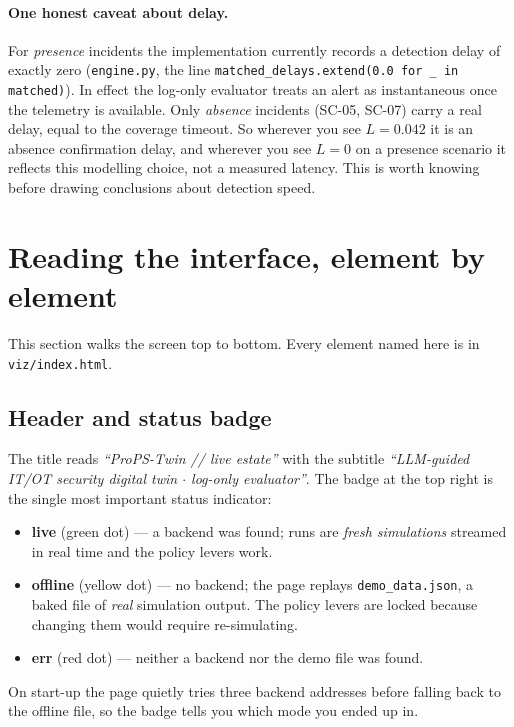 \documentclass[11pt]{article}
\newcommand{\code}[1]{\texttt{\small #1}}
\newcommand{\file}[1]{\textcolor{mfpurple}{\texttt{\small #1}}}
\begin{document}
\paragraph{One honest caveat about delay.} For \emph{presence} incidents the
implementation currently records a detection delay of exactly zero
(\file{engine.py}, the line
\code{matched\_delays.extend(0.0 for \_ in matched)}). In effect the log-only
evaluator treats an alert as instantaneous once the telemetry is available.
Only \emph{absence} incidents (SC-05, SC-07) carry a real delay, equal to the
coverage timeout. So wherever you see $L=0.042$ it is an absence confirmation
delay, and wherever you see $L=0$ on a presence scenario it reflects this
modelling choice, not a measured latency. This is worth knowing before drawing
conclusions about detection speed.

\section{Reading the interface, element by element}
\label{sec:interface}

This section walks the screen top to bottom. Every element named here is in
\file{viz/index.html}.

\subsection{Header and status badge}
The title reads \emph{``ProPS-Twin // live estate''} with the subtitle
\emph{``LLM-guided IT/OT security digital twin $\cdot$ log-only evaluator''}. The
badge at the top right is the single most important status indicator:
\begin{itemize}[leftmargin=1.4em,nosep]
  \item \textbf{live} (green dot) --- a backend was found; runs are \emph{fresh
        simulations} streamed in real time and the policy levers work.
  \item \textbf{offline} (yellow dot) --- no backend; the page replays
        \code{demo\_data.json}, a baked file of \emph{real} simulation output.
        The policy levers are locked because changing them would require
        re-simulating.
  \item \textbf{err} (red dot) --- neither a backend nor the demo file was found.
\end{itemize}
On start-up the page quietly tries three backend addresses before falling back to
the offline file, so the badge tells you which mode you ended up in.
\end{document}
